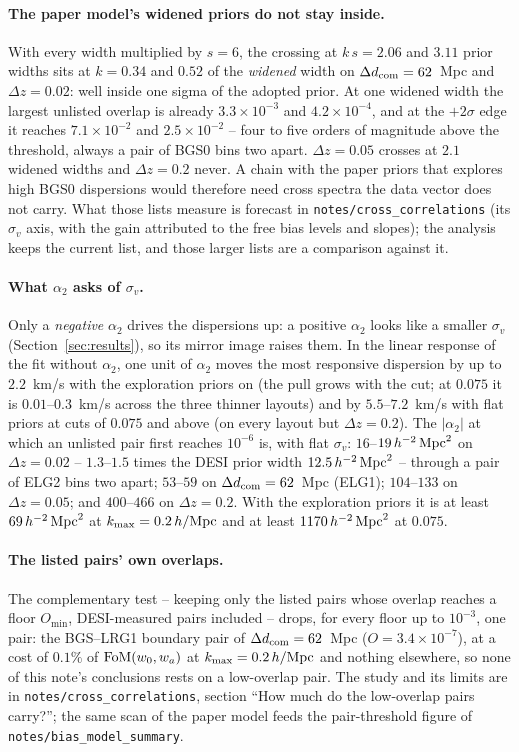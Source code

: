 \documentclass[11pt]{article}
\newcommand{\kmax}{k_{\rm max}}
\newcommand{\hMpc}{\,h/{\rm Mpc}}
\newcommand{\aunit}{\,h^{-2}\,{\rm Mpc}^2}
\newcommand{\sv}{\sigma_v}
\newcommand{\dcom}{$\Delta d_{\rm com} = 62$~Mpc}
\newcommand{\us}{\_\allowbreak}
\begin{document}
\paragraph{The paper model's widened priors do not stay inside.}
With every width multiplied by $s = 6$, the crossing at $k\,s = 2.06$
and $3.11$ prior widths sits at $k = 0.34$ and $0.52$ of the
\emph{widened} width on \dcom{} and $\Delta z = 0.02$: well inside
one sigma of the adopted prior.  At one widened width the largest
unlisted overlap is already $3.3\times10^{-3}$ and
$4.2\times10^{-4}$, and at the $+2\sigma$ edge it reaches
$7.1\times10^{-2}$ and $2.5\times10^{-2}$ -- four to five orders of
magnitude above the threshold, always a pair of BGS0 bins two apart.
$\Delta z = 0.05$ crosses at $2.1$ widened widths and
$\Delta z = 0.2$ never.  A chain with the paper priors that explores
high BGS0 dispersions would therefore need cross spectra the data
vector does not carry.  What those lists measure is forecast in
\texttt{notes/cross\us correlations} (its $\sv$ axis, with the gain
attributed to the free bias levels and slopes); the analysis keeps
the current list, and those larger lists are a comparison against
it.

\paragraph{What $\alpha_2$ asks of $\sv$.}
Only a \emph{negative} $\alpha_2$ drives the dispersions up: a
positive $\alpha_2$ looks like a smaller $\sv$
(Section~\ref{sec:results}), so its mirror image raises them.  In the
linear response of the fit without $\alpha_2$, one unit of $\alpha_2$
moves the most responsive dispersion by up to $2.2$~km/s with the
exploration priors on (the pull grows with the cut; at $0.075$ it is
$0.01$--$0.3$~km/s across the three thinner layouts) and by
$5.5$--$7.2$~km/s with flat priors at cuts of $0.075$ and above (on
every layout but $\Delta z = 0.2$).  The $|\alpha_2|$ at which an
unlisted pair first reaches $10^{-6}$ is, with flat $\sv$:
$16$--$19\aunit$ on $\Delta z = 0.02$ -- $1.3$--$1.5$ times the DESI
prior width $12.5\aunit$ -- through a pair of ELG2 bins two apart;
$53$--$59$ on \dcom{} (ELG1); $104$--$133$ on $\Delta z = 0.05$; and
$400$--$466$ on $\Delta z = 0.2$.  With the exploration priors it is
at least $69\aunit$ at $\kmax = 0.2\hMpc$ and at least
$1170\aunit$ at $0.075$.

\paragraph{The listed pairs' own overlaps.}
The complementary test -- keeping only the listed pairs whose overlap
reaches a floor $O_{\min}$, DESI-measured pairs included -- drops, for
every floor up to $10^{-3}$, one pair: the BGS--LRG1 boundary pair of
\dcom{} ($O = 3.4\times10^{-7}$), at a cost of $0.1\%$ of
${\rm FoM}(w_0, w_a)$ at $\kmax = 0.2\hMpc$ and nothing elsewhere, so
none of this note's conclusions rests on a low-overlap pair.  The
study and its limits are in \texttt{notes/cross\us correlations},
section ``How much do the low-overlap pairs carry?''; the same scan of
the paper model feeds the pair-threshold figure of
\texttt{notes/bias\us model\us summary}.
\end{document}
